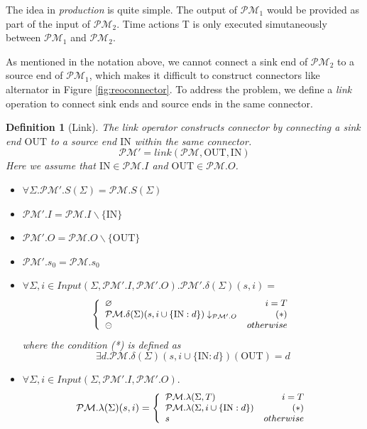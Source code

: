 \documentclass[conference, a4paper]{IEEEtran}
\newtheorem{definition}{Definition}
\newcommand{\rblock}[0]{\circleddash}
\newcommand{\rempty}[0]{\varnothing}
\newcommand{\OUT}[0]{\mbox{OUT}}
\newcommand{\IN}[0]{\mbox{IN}}
\begin{document}
The idea in \emph{production} is quite simple. The output of $\mathcal{PM}_1$ would be provided as part of the
input of $\mathcal{PM}_2$. Time actions T is only executed simutaneously between $\mathcal{PM}_1$ and $\mathcal{PM}_2$.

As mentioned in the notation above, we cannot connect a sink end of $\mathcal{PM}_2$ to a source end of
$\mathcal{PM}_1$, which makes it difficult to construct connectors like alternator in Figure
\ref{fig:reoconnector}. To address the problem, we define a \emph{link} operation to connect sink
ends and source ends in the same connector.

\begin{definition}[Link]
  The \emph{link} operator constructs connector by connecting a sink end $\OUT$ to a source end $\IN$
  within the same connector.   
  \[
  \mathcal{PM}' = link(\mathcal{PM}, \OUT, \IN)
  \]
  Here we assume that $\IN\in \mathcal{PM}.I$ and $\OUT\in \mathcal{PM}.O$.

  \begin{itemize}
  	\item[-] $\forall\Sigma. \mathcal{PM}'.S(\Sigma)=\mathcal{PM}.S(\Sigma)$
    \item[-] $\mathcal{PM}'.I=\mathcal{PM}.I\backslash\{\IN\}$
    \item[-] $\mathcal{PM}'.O=\mathcal{PM}.O\backslash\{\OUT\}$
    \item[-] $\mathcal{PM}'.s_0=\mathcal{PM}.s_0$
    \item[-] $\forall\Sigma, i\in
      Input(\Sigma,\mathcal{PM}'.I,\mathcal{PM}'.O).\mathcal{PM}'.\delta(\Sigma)(s,i)=$
      \begin{displaymath}
        \small
        \left\{
        \begin{array}[h]{lr}
          \rempty & i=T \\
          \mathcal{PM}.\delta(\Sigma)(s,i\cup\{\IN:d\})\downarrow_{\mathcal{PM}'.O} & (*)\\
          \rblock & otherwise \\
        \end{array}
        \right.
      \end{displaymath}
      where the condition (*) is defined as
      \[
      \exists d.\mathcal{PM}.\delta(\Sigma)(s,i\cup\{\IN:d\})(\OUT)=d
      \]
    \item[-] $\forall\Sigma, i\in
      Input(\Sigma,\mathcal{PM}'.I,\mathcal{PM}'.O).$
      \begin{displaymath}
        \small
        \mathcal{PM}.\lambda(\Sigma)(s,i)=
        \left\{
        \begin{array}[ht]{lr}
          \mathcal{PM}.\lambda(\Sigma,T) & i=T \\
          \mathcal{PM}.\lambda(\Sigma,i\cup\{\IN:d\}) & (*)\\
          s & otherwise \\
        \end{array}
        \right.
      \end{displaymath}
  \end{itemize}
\end{definition}
\end{document}
